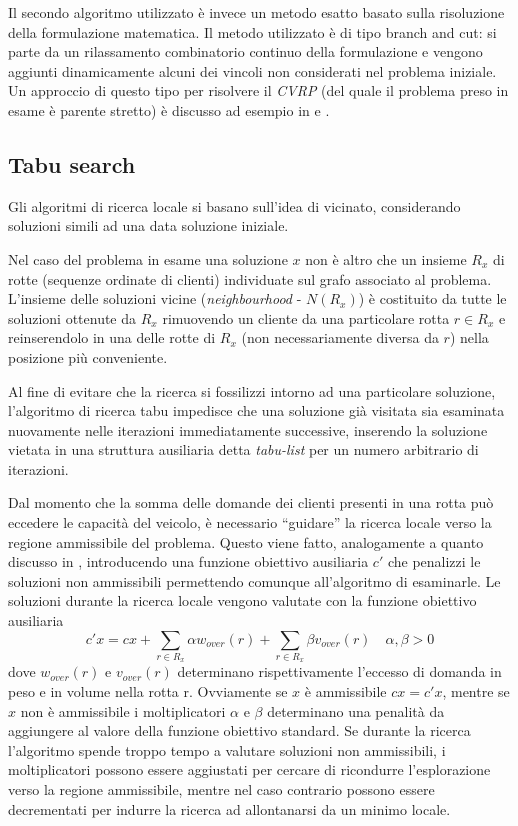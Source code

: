 \documentclass[11pt,oneside,a4paper]{article}
\begin{document}
Il secondo algoritmo utilizzato è invece un metodo esatto basato sulla risoluzione della
formulazione matematica. Il metodo utilizzato è di tipo branch and cut: si parte da un
rilassamento combinatorio continuo della formulazione e vengono aggiunti
dinamicamente alcuni dei vincoli non considerati nel problema iniziale. Un approccio di questo tipo per
risolvere il \emph{CVRP} (del quale il problema preso in esame è parente stretto) è discusso ad esempio in
\cite{augerat98} e \cite{ralphs03}.

\subsection{Tabu search}
Gli algoritmi di ricerca locale si basano sull'idea di vicinato, considerando soluzioni
simili ad una data soluzione iniziale.

Nel caso del problema in esame una soluzione $x$ non è altro che un insieme $R_x$ di rotte
(sequenze ordinate di clienti) individuate sul grafo associato al problema.
L'insieme delle soluzioni vicine (\emph{neighbourhood} - $N(R_x)$) è costituito
da tutte le soluzioni ottenute da $R_x$ rimuovendo un cliente da una particolare rotta $r \in R_x$
e reinserendolo in una delle rotte di $R_x$ (non necessariamente diversa da $r$) nella posizione
più conveniente.

Al fine di evitare che la ricerca si fossilizzi intorno ad una particolare soluzione, l'algoritmo
di ricerca tabu impedisce che una soluzione già visitata sia esaminata nuovamente nelle iterazioni
immediatamente successive, inserendo la soluzione vietata in una struttura ausiliaria detta
\emph{tabu-list} per un numero arbitrario di iterazioni.

Dal momento che la somma delle domande dei clienti presenti in una rotta può eccedere le capacità
del veicolo, è necessario ``guidare'' la ricerca locale verso la regione ammissibile del problema.
Questo viene fatto, analogamente a quanto discusso in \cite{gend94}, introducendo una funzione
obiettivo ausiliaria $c'$ che penalizzi le soluzioni non ammissibili permettendo comunque
all'algoritmo di esaminarle. Le soluzioni durante la ricerca locale vengono valutate con
la funzione obiettivo ausiliaria
\begin{equation*}
  c'x = cx + \sum_{r \in R_x}\alpha w_{over}(r) + \sum_{r \in R_x}\beta v_{over}(r)
    \quad \alpha,\beta > 0
\end{equation*}
dove $w_{over}(r)$ e $v_{over}(r)$ determinano rispettivamente l'eccesso di domanda
in peso e in volume nella rotta r. Ovviamente se $x$ è ammissibile $cx = c'x$,
mentre se $x$ non è ammissibile i moltiplicatori $\alpha$ e $\beta$ determinano
una penalità da aggiungere al valore della funzione obiettivo standard.
Se durante la ricerca l'algoritmo spende troppo tempo a valutare soluzioni non ammissibili, i
moltiplicatori possono essere aggiustati per cercare di ricondurre l'esplorazione verso la
regione ammissibile, mentre nel caso contrario possono essere decrementati per indurre la ricerca
ad allontanarsi da un minimo locale.
\end{document}
